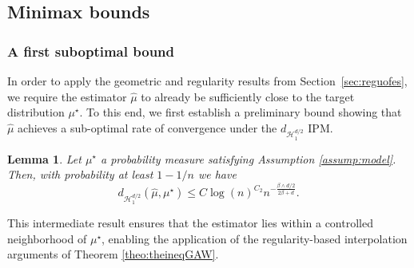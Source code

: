 \documentclass[10pt]{article}
\newtheorem{lemma}{Lemma}
\begin{document}
\subsection{Minimax bounds}

\subsubsection{A first suboptimal bound}
In order to apply the geometric and regularity results from Section~\ref{sec:reguofes}, we require the estimator \( \hat{\mu} \) to already be sufficiently close to the target distribution \( \mu^\star \). To this end, we first establish a preliminary bound showing that \( \hat{\mu} \) achieves a sub-optimal rate of convergence under the \( d_{\mathcal{H}^{d/2}_1} \) IPM.



\begin{lemma}\label{lemma:firstbadbound}
 Let $\mu^\star$ a probability measure satisfying Assumption \ref{assump:model}. Then, with probability at least $1-1/n$ we have
    $$d_{\mathcal{H}^{d/2}_1}(\hat{\mu},\mu^\star)\leq C\log(n)^{C_2} n^{-\frac{\beta\wedge d/2}{2\beta+d}}.$$
\end{lemma}

This intermediate result ensures that the estimator lies within a controlled neighborhood of \( \mu^\star \), enabling the application of the regularity-based interpolation arguments of Theorem \ref{theo:theineqGAW}. 
\end{document}
